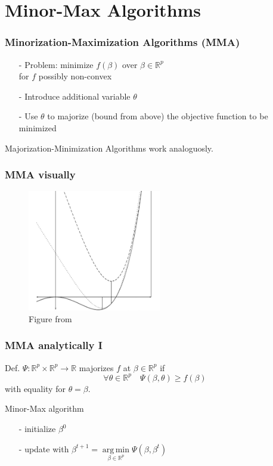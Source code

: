 \documentclass{beamer}
\newcommand{\R}{\mathbb{R}}
\DeclareMathOperator*{\argmin}{arg\,min}
\begin{document}

\section{Minor-Max Algorithms}

\begin{frame}
\frametitle{Minorization-Maximization Algorithms (MMA)}
\begin{itemize}
\item[-] Problem: minimize $f(\beta)$ over $\beta\in\R^p$\\ for $f$ possibly non-convex
\item[-] Introduce additional variable $\theta$
\item[-] Use $\theta$ to majorize (bound from above) the objective function to be minimized
\end{itemize}






{\small Majorization-Minimization Algorithms work analoguosly.}
\end{frame}

\begin{frame}
\frametitle{MMA visually}
\begin{figure}
\includegraphics[height=150pt]{img/minmaxalgo2.png}
\caption{Figure from \cite{DL15}}
\end{figure}

\end{frame}

\begin{frame}
\frametitle{MMA analytically I}
Def. 
$\Psi:\R^p\times\R^p\to\R$ {\color{blue}majorizes} $f$ at $\beta\in\R^p$ if \[\forall\theta\in\R^p\quad \Psi(\beta,\theta)\ge f(\beta)\]
with equality for $\theta=\beta$.
\vspace{10pt}

Minor-Max algorithm
\begin{itemize}
\item[-] initialize $\beta^0$
\item[-] update with $\beta^{t+1}=\argmin\limits_{\beta\in\R^p}\Psi(\beta,\beta^t)$
\end{itemize}
\end{frame}
\end{document}
